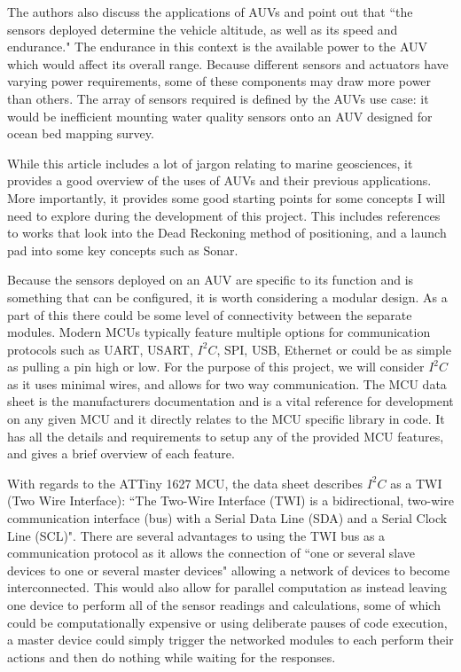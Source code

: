 \documentclass[11pt,a4paper,titlepage]{report}
\begin{document}
	The authors also discuss the applications of AUVs and point out that ``the sensors deployed determine the vehicle altitude, as well as its speed and endurance."\cite{AUV_PPF} The endurance in this context is the available power to the AUV which would affect its overall range. Because different sensors and actuators have varying power requirements, some of these components may draw more power than others. The array of sensors required is defined by the AUVs use case: it would be inefficient mounting water quality sensors onto an AUV designed for ocean bed mapping survey. 
	
	While this article includes a lot of jargon relating to marine geosciences, it provides a good overview of the uses of AUVs and their previous applications. More importantly, it provides some good starting points for some concepts I will need to  explore during the development of this project. This includes references to works that look into the Dead Reckoning method of positioning, and a launch pad into some key concepts such as Sonar. 

	Because the sensors deployed on an AUV are specific to its function and is something that can be configured, it is worth considering a modular design. As a part of this there could be some level of connectivity between the separate modules. Modern MCUs typically feature multiple options for communication protocols such as UART, USART, $I^{2}C$, SPI, USB, Ethernet or could be as simple as pulling a pin high or low. For the purpose of this project, we will consider $I^{2}C$ as it uses minimal wires, and allows for two way communication. The MCU data sheet\cite{ATTINY1627} is the manufacturers documentation and is a vital reference for development on any given  MCU and it directly relates to the MCU specific library in code. It has all the details and requirements to setup any of the provided MCU features, and gives a brief overview of each feature. 
	
	With regards to the ATTiny 1627 MCU, the data sheet describes $I^{2}C$ as a TWI (Two Wire Interface): ``The Two-Wire Interface (TWI) is a bidirectional, two-wire communication interface (bus) with a Serial Data Line (SDA) and a Serial Clock Line (SCL)"\cite{ATTINY1627}. There are several advantages to using the TWI bus as a communication protocol as it allows the connection of ``one or several slave devices to one or several master devices"\cite{ATTINY1627} allowing a network of devices to become interconnected. This would also allow for parallel computation as instead leaving one device to perform all of the sensor readings and calculations, some of which could be computationally expensive or using deliberate pauses of code execution, a master device could simply trigger the networked modules to each perform their actions and then do nothing while waiting for the responses. 
	
\end{document}
